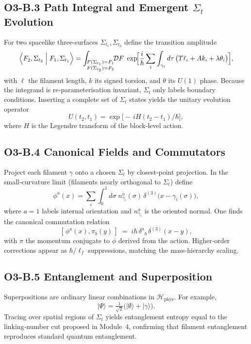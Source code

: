 \documentclass[12pt]{article}
\begin{document}
\subsection*{O3-B.3 \quad Path Integral and Emergent $\Sigma_t$ Evolution}
For two spacelike three‑surfaces $\Sigma_{t_1},\Sigma_{t_2}$ define the transition amplitude
\[
  \Bigl\langle F_2,\Sigma_{t_2} \Bigm| F_1,\Sigma_{t_1} \Bigr\rangle
  = \int_{\substack{F(\Sigma_{t_1})=F_1\\ F(\Sigma_{t_2})=F_2}}
    \!\!\mathcal D F\;
    \exp\!\Bigl[\frac{i}{\hbar}\sum_i\int_{\gamma_i}d\tau\,\bigl(T\ell_i + A k_i + \lambda\theta_i\bigr)\Bigr],
\]
with $\ell$ the filament length, $k$ its signed torsion, and $\theta$ its $U(1)$ phase.  Because the integrand is re‑parameterisation invariant, $\Sigma_t$ only labels boundary conditions.  Inserting a complete set of $\Sigma_t$ states yields the unitary evolution operator
\[
  U(t_2,t_1) = \exp\!\bigl[-\,i H (t_2-t_1)/\hbar\bigr],
\]
where $H$ is the Legendre transform of the block‑level action.

\subsection*{O3-B.4 \quad Canonical Fields and Commutators}
Project each filament $\gamma$ onto a chosen $\Sigma_t$ by closest‑point projection.  In the small‑curvature limit (filaments nearly orthogonal to $\Sigma_t$) define
\[
  \phi^a(x) = \sum_i \int_{0}^{1} d\sigma\;
  n^{a}_{\gamma_i}(\sigma)\,\delta^{(3)}\!\bigl(x-\gamma_i(\sigma)\bigr),
\]
where $a=1$ labels internal orientation and $n^{a}_{\gamma_i}$ is the oriented normal.  One finds the canonical commutation relation
\[
  [\,\phi^a(x),\pi_b(y)\,] \;=\; i\hbar\,\delta^a{}_b\,\delta^{(3)}(x-y),
\]
with $\pi$ the momentum conjugate to $\phi$ derived from the action.  Higher‑order corrections appear as $\hbar/\ell_f$ suppressions, matching the mass‑hierarchy scaling.

\subsection*{O3-B.5 \quad Entanglement and Superposition}
Superpositions are ordinary linear combinations in $\mathcal H_{\text{phys}}$.  For example,
\[
  \lvert\Psi\rangle = \tfrac{1}{\sqrt2}\bigl(\lvert\emptyset\rangle + \lvert\gamma\rangle\bigr).
\]
Tracing over spatial regions of $\Sigma_t$ yields entanglement entropy equal to the linking‑number cut proposed in Module~4, confirming that filament entanglement reproduces standard quantum entanglement.
\end{document}
